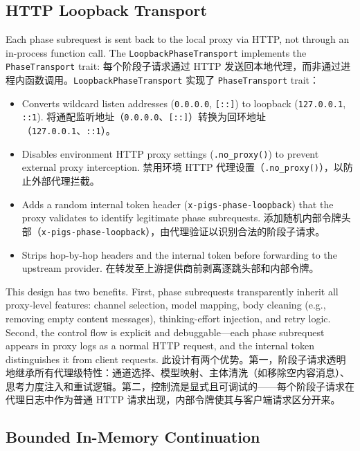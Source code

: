 \subsection{HTTP Loopback Transport}
\label{sec:loopback}

Each phase subrequest is sent back to the local proxy via HTTP, not through an in-process function call. The \texttt{LoopbackPhaseTransport} implements the \texttt{PhaseTransport} trait:
每个阶段子请求通过 HTTP 发送回本地代理，而非通过进程内函数调用。\texttt{LoopbackPhaseTransport} 实现了 \texttt{PhaseTransport} trait：

\begin{itemize}[nosep]
    \item Converts wildcard listen addresses (\texttt{0.0.0.0}, \texttt{[::]}) to loopback (\texttt{127.0.0.1}, \texttt{::1}).
    将通配监听地址（\texttt{0.0.0.0}、\texttt{[::]}）转换为回环地址（\texttt{127.0.0.1}、\texttt{::1}）。
    \item Disables environment HTTP proxy settings (\texttt{.no\_proxy()}) to prevent external proxy interception.
    禁用环境 HTTP 代理设置（\texttt{.no\_proxy()}），以防止外部代理拦截。
    \item Adds a random internal token header (\texttt{x-pigs-phase-loopback}) that the proxy validates to identify legitimate phase subrequests.
    添加随机内部令牌头部（\texttt{x-pigs-phase-loopback}），由代理验证以识别合法的阶段子请求。
    \item Strips hop-by-hop headers and the internal token before forwarding to the upstream provider.
    在转发至上游提供商前剥离逐跳头部和内部令牌。
\end{itemize}

This design has two benefits. First, phase subrequests transparently inherit all proxy-level features: channel selection, model mapping, body cleaning (e.g., removing empty content messages), thinking-effort injection, and retry logic. Second, the control flow is explicit and debuggable---each phase subrequest appears in proxy logs as a normal HTTP request, and the internal token distinguishes it from client requests.
此设计有两个优势。第一，阶段子请求透明地继承所有代理级特性：通道选择、模型映射、主体清洗（如移除空内容消息）、思考力度注入和重试逻辑。第二，控制流是显式且可调试的——每个阶段子请求在代理日志中作为普通 HTTP 请求出现，内部令牌使其与客户端请求区分开来。

\subsection{Bounded In-Memory Continuation}
\label{sec:continuation}

